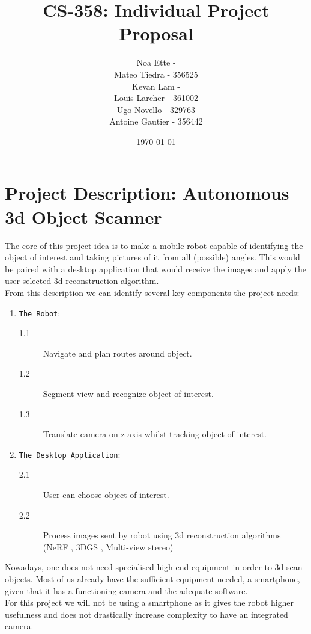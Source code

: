 \documentclass{article}
\title{CS-358: Individual Project Proposal}
\author{Noa Ette - \\Mateo Tiedra - 356525\\Kevan Lam - \\Louis Larcher - 361002\\Ugo Novello - 329763\\Antoine Gautier - 356442}
\date{\today}
\begin{document}
\maketitle
\vspace{45mm}
\tableofcontents
\newpage
\section{Project Description: Autonomous 3d Object Scanner}

The core of this project idea is to make a mobile robot capable of identifying the object of interest and taking pictures of it from all (possible) angles. 
This would be paired with a desktop application that would receive the images and apply the user selected 3d reconstruction algorithm.\\


From this description we can identify several key components the project needs: \begin{enumerate}
    \item \texttt{The Robot}:
    \begin{description}
            \item[1.1] Navigate and plan routes around object.
            \item[1.2] Segment view and recognize object of interest.
            \item[1.3] Translate camera on z axis whilst tracking object of interest.
    \end{description}
    \item \texttt{The Desktop Application}:
    \begin{description}
        \item[2.1] User can choose object of interest.
        \item[2.2] Process images sent by robot using 3d reconstruction algorithms (NeRF \cite{mildenhall2020nerf}, 3DGS \cite{kerbl3Dgaussians}, Multi-view stereo)
    \end{description}
\end{enumerate}

Nowadays, one does not need specialised high end equipment in order to 3d scan objects. Most of us already have the sufficient equipment needed, a smartphone, given that it has a functioning camera and the adequate software. \\
For this project we will not be using a smartphone as it gives the robot higher usefulness and does not drastically increase complexity to have an integrated camera. 
\end{document}
